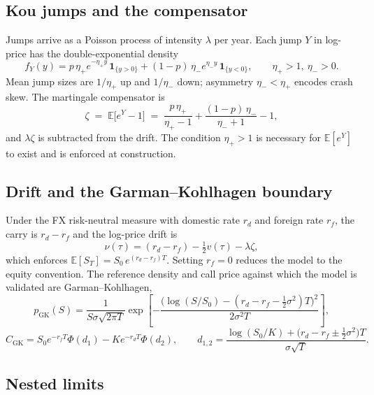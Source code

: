\documentclass[11pt]{article}
\begin{document}
\subsection{Kou jumps and the compensator}

Jumps arrive as a Poisson process of intensity $\lambda$ per year. Each jump
$Y$ in log-price has the double-exponential density
\begin{equation}
f_Y(y) = p\,\eta_+ e^{-\eta_+ y}\,\mathbf{1}_{\{y>0\}}
       + (1-p)\,\eta_- e^{\eta_- y}\,\mathbf{1}_{\{y<0\}},
\qquad \eta_+ > 1,\ \eta_- > 0 .
\end{equation}
Mean jump sizes are $1/\eta_+$ up and $1/\eta_-$ down; asymmetry
$\eta_- < \eta_+$ encodes crash skew. The martingale compensator is
\begin{equation}
\zeta \;=\; \mathbb{E}\big[e^{Y} - 1\big]
\;=\; \frac{p\,\eta_+}{\eta_+ - 1} + \frac{(1-p)\,\eta_-}{\eta_- + 1} - 1,
\label{eq:comp}
\end{equation}
and $\lambda\zeta$ is subtracted from the drift. The condition $\eta_+ > 1$
is necessary for $\mathbb{E}[e^Y]$ to exist and is enforced at construction.

\subsection{Drift and the Garman--Kohlhagen boundary}

Under the FX risk-neutral measure with domestic rate $r_d$ and foreign rate
$r_f$, the carry is $r_d - r_f$ and the log-price drift is
\begin{equation}
\nu(\tau) = (r_d - r_f) - \tfrac{1}{2}v(\tau) - \lambda\zeta ,
\label{eq:nu}
\end{equation}
which enforces $\mathbb{E}[S_T] = S_0\,e^{(r_d - r_f)T}$. Setting $r_f = 0$
reduces the model to the equity convention. The reference density and call
price against which the model is validated are Garman--Kohlhagen,
\begin{equation}
p_{\mathrm{GK}}(S) = \frac{1}{S\sigma\sqrt{2\pi T}}
  \exp\!\left[-\frac{\big(\log(S/S_0) - (r_d - r_f - \tfrac{1}{2}\sigma^2)T\big)^2}
  {2\sigma^2 T}\right],
\end{equation}
\begin{equation}
C_{\mathrm{GK}} = S_0 e^{-r_f T}\Phi(d_1) - K e^{-r_d T}\Phi(d_2),
\qquad
d_{1,2} = \frac{\log(S_0/K) + \big(r_d - r_f \pm \tfrac{1}{2}\sigma^2\big)T}
  {\sigma\sqrt{T}} .
\end{equation}

\subsection{Nested limits}
\end{document}
